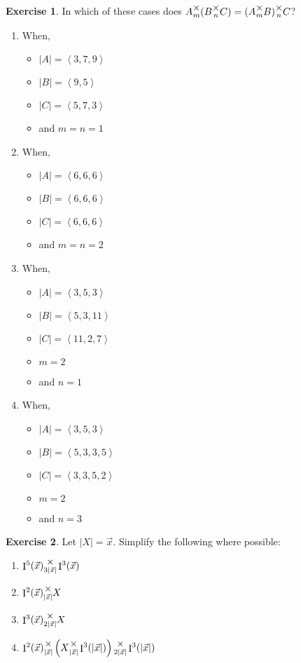 \documentclass[12pt]{book}
\theoremstyle{plain}
\theoremstyle{definition}
\newtheorem{exercise}{Exercise}[chapter]
\theoremstyle{ppart}
\theoremstyle{case}
\theoremstyle{solution}
\DeclareMathOperator{\Ident}{I}
\newcommand{\mmult}[1]{\text{\raisebox{1ex}{$\underset{#1}{\times}$}}}
\newcommand{\shape}[1]{\left|#1\right|}
\begin{document}
\begin{exercise}
In which of these cases does $A \mmult{m} (B \mmult{n} C) = (A \mmult{m} B) \mmult{n} C$?
\begin{enumerate}
\item When,
	\begin{itemize}
		\item $\shape{A} = \left<3, 7, 9\right>$
		\item $\shape{B} = \left<9, 5\right>$
		\item $\shape{C} = \left<5, 7, 3\right>$
		\item and $m = n = 1$
	\end{itemize}
\item When,
	\begin{itemize}
		\item $\shape{A} = \left<6, 6, 6\right>$
		\item $\shape{B} = \left<6, 6, 6\right>$
		\item $\shape{C} = \left<6, 6, 6\right>$
		\item and $m = n = 2$
	\end{itemize}
\item When,
	\begin{itemize}
		\item $\shape{A} = \left<3, 5, 3\right>$
		\item $\shape{B} = \left<5, 3, 11\right>$
		\item $\shape{C} = \left<11, 2, 7\right>$
		\item $m = 2$
		\item and $n = 1$
	\end{itemize}
\item When,
	\begin{itemize}
		\item $\shape{A} = \left<3, 5, 3\right>$
		\item $\shape{B} = \left<5, 3, 3, 5\right>$
		\item $\shape{C} = \left<3, 3, 5, 2\right>$
		\item $m = 2$
		\item and $n = 3$
	\end{itemize}
\end{enumerate}
\end{exercise}

\begin{exercise}
Let $\shape{X} = \vec{x}$. Simplify the following where possible:
\begin{enumerate}
\item $\Ident^5(\vec{x}) \mmult{3 \shape{\vec{x}}} \Ident^3(\vec{x})$
\item $\Ident^2(\vec{x}) \mmult{\shape{\vec{x}}} X$
\item $\Ident^3(\vec{x}) \mmult{2\shape{\vec{x}}} X$
\item $\Ident^2(\vec{x}) \mmult{\shape{\vec{x}}} \left(X \mmult{\shape{\vec{x}}} \Ident^3(\shape{\vec{x}})
				\right) \mmult{2\shape{\vec{x}}} \Ident^3(\shape{\vec{x}})$
\end{enumerate}
\end{exercise}
\end{document}
